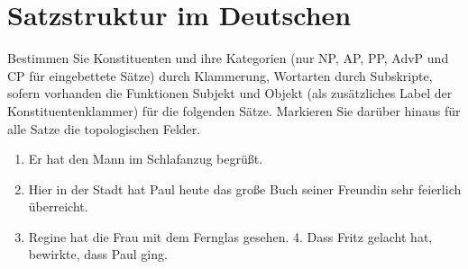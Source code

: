 \section{Satzstruktur im Deutschen}
Bestimmen Sie Konstituenten und ihre Kategorien (nur NP, AP, PP, AdvP und CP für eingebettete Sätze) durch Klammerung, Wortarten durch Subskripte, sofern vorhanden die Funktionen Subjekt und Objekt (als zusätzliches Label der Konstituentenklammer) für die folgenden Sätze.
Markieren Sie darüber hinaus für alle Satze die topologischen Felder.

\begin{enumerate}
  \item Er hat den Mann im Schlafanzug begrüßt.
  \item Hier in der Stadt hat Paul heute das große Buch seiner Freundin sehr feierlich überreicht.
  \item Regine hat die Frau mit dem Fernglas gesehen. 4. Dass Fritz gelacht hat, bewirkte, dass Paul ging.
\end{enumerate}
